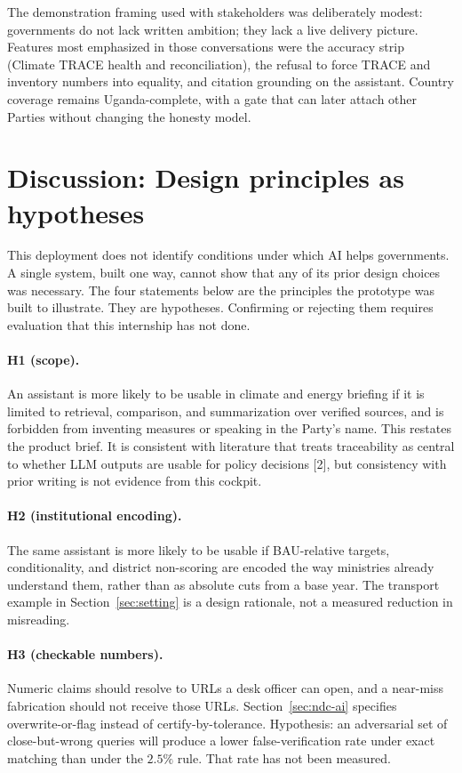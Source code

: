 \documentclass{article}
\begin{document}
The demonstration framing used with stakeholders was deliberately modest: governments do not lack written ambition; they lack a live delivery picture. Features most emphasized in those conversations were the accuracy strip (Climate TRACE health and reconciliation), the refusal to force TRACE and inventory numbers into equality, and citation grounding on the assistant. Country coverage remains Uganda-complete, with a gate that can later attach other Parties without changing the honesty model.

\section{Discussion: Design principles as hypotheses}
\label{sec:discussion}

This deployment does not identify conditions under which AI helps governments. A single system, built one way, cannot show that any of its prior design choices was necessary. The four statements below are the principles the prototype was built to illustrate. They are hypotheses. Confirming or rejecting them requires evaluation that this internship has not done.

\paragraph{H1 (scope).}
An assistant is more likely to be usable in climate and energy briefing if it is limited to retrieval, comparison, and summarization over verified sources, and is forbidden from inventing measures or speaking in the Party's name. This restates the product brief. It is consistent with literature that treats traceability as central to whether LLM outputs are usable for policy decisions [2], but consistency with prior writing is not evidence from this cockpit.

\paragraph{H2 (institutional encoding).}
The same assistant is more likely to be usable if BAU-relative targets, conditionality, and district non-scoring are encoded the way ministries already understand them, rather than as absolute cuts from a base year. The transport example in Section~\ref{sec:setting} is a design rationale, not a measured reduction in misreading.

\paragraph{H3 (checkable numbers).}
Numeric claims should resolve to URLs a desk officer can open, and a near-miss fabrication should not receive those URLs. Section~\ref{sec:ndc-ai} specifies overwrite-or-flag instead of certify-by-tolerance. Hypothesis: an adversarial set of close-but-wrong queries will produce a lower false-verification rate under exact matching than under the $2.5\%$ rule. That rate has not been measured.
\end{document}
